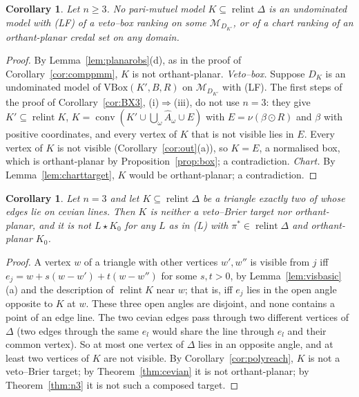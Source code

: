 \documentclass[11pt]{article}
\newcommand{\M}{\mathcal{M}}
\DeclareMathOperator{\conv}{conv}
\DeclareMathOperator{\relint}{relint}
\theoremstyle{plain}
\newtheorem{corollary}[theorem]{Corollary}
\theoremstyle{definition}
\theoremstyle{remark}
\begin{document}
\begin{corollary}\label{cor:pmmvbox}
Let $n\ge3$. No pari-mutuel model $K\subseteq\relint\Delta$ is an undominated model with
(LF) of a veto--box ranking on some $\M_{D_{K'}}$, or of a chart ranking of an
orthant-planar credal set on any domain.
\end{corollary}

\begin{proof}
By Lemma~\ref{lem:planarobs}(d), as in the proof of Corollary~\ref{cor:comppmm}, $K$ is not
orthant-planar. \emph{Veto--box.} Suppose $D_K$ is an undominated model of
$\mathrm{VBox}(K',B,R)$ on $\M_{D_{K'}}$ with (LF). The first steps of the proof of
Corollary~\ref{cor:BX3}, (i)$\Rightarrow$(iii), do not use $n=3$: they give $K'\subseteq
\relint K$, $K=\conv(K'\cup\bigcup_\omega\hat A_\omega\cup E)$ with $E=\nu(\beta\odot R)$
and $\beta$ with positive coordinates, and every vertex of $K$ that is not visible lies in
$E$. Every vertex of $K$ is not visible (Corollary~\ref{cor:out}(a)), so $K=E$, a
normalised box, which is orthant-planar by Proposition~\ref{prop:box}; a contradiction.
\emph{Chart.} By Lemma~\ref{lem:charttarget}, $K$ would be orthant-planar; a contradiction.
\end{proof}

\begin{corollary}\label{cor:twocevian}
Let $n=3$ and let $K\subseteq\relint\Delta$ be a triangle exactly two of whose edges lie on
cevian lines. Then $K$ is neither a veto--Brier target nor orthant-planar, and it is not
$L\star K_0$ for any $L$ as in (L) with $\pi^\ast\in\relint\Delta$ and orthant-planar
$K_0$.
\end{corollary}

\begin{proof}
A vertex $w$ of a triangle with other vertices $w',w''$ is visible from $j$ iff
$e_j=w+s(w-w')+t(w-w'')$ for some $s,t>0$, by Lemma~\ref{lem:visbasic}(a) and the
description of $\relint K$ near $w$; that is, iff $e_j$ lies in the open angle opposite to
$K$ at $w$. These three open angles are disjoint, and none contains a point of an edge line.
The two cevian edges pass through two different vertices of $\Delta$ (two edges through
the same $e_l$ would share the line through $e_l$ and their common vertex). So at most one
vertex of $\Delta$ lies in an opposite angle, and at least two vertices of $K$ are not
visible. By Corollary~\ref{cor:polyreach}, $K$ is not a veto--Brier target; by
Theorem~\ref{thm:cevian} it is not orthant-planar; by Theorem~\ref{thm:n3} it is not such a
composed target.
\end{proof}
\end{document}
